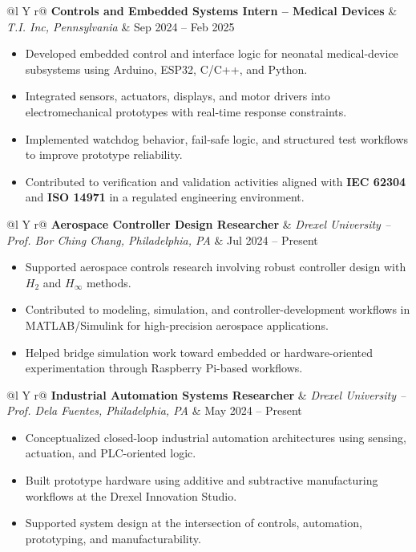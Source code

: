 \documentclass[10pt,letterpaper]{article}
\makeatletter
\newenvironment{role}[4]
{
\begin{tabularx}{\textwidth}{@{}l Y r@{}}
\textbf{#1} & \textit{#2, #3} & #4
\end{tabularx}
\vspace{-0.45em}
\begin{itemize}[leftmargin=1.2em, itemsep=0.18em, topsep=0.2em]
}
{
\end{itemize}
\vspace{0.15em}
}
\makeatother
\begin{document}
\begin{role}
{Controls and Embedded Systems Intern -- Medical Devices}
{T.I. Inc}
{Pennsylvania}
{Sep 2024 -- Feb 2025}
    \item Developed embedded control and interface logic for neonatal medical-device subsystems using Arduino, ESP32, C/C++, and Python.
    \item Integrated sensors, actuators, displays, and motor drivers into electromechanical prototypes with real-time response constraints.
    \item Implemented watchdog behavior, fail-safe logic, and structured test workflows to improve prototype reliability.
    \item Contributed to verification and validation activities aligned with \textbf{IEC 62304} and \textbf{ISO 14971} in a regulated engineering environment.
\end{role}

\begin{role}
{Aerospace Controller Design Researcher}
{Drexel University -- Prof. Bor Ching Chang}
{Philadelphia, PA}
{Jul 2024 -- Present}
    \item Supported aerospace controls research involving robust controller design with $H_2$ and $H_\infty$ methods.
    \item Contributed to modeling, simulation, and controller-development workflows in MATLAB/Simulink for high-precision aerospace applications.
    \item Helped bridge simulation work toward embedded or hardware-oriented experimentation through Raspberry Pi-based workflows.
\end{role}

\begin{role}
{Industrial Automation Systems Researcher}
{Drexel University -- Prof. Dela Fuentes}
{Philadelphia, PA}
{May 2024 -- Present}
    \item Conceptualized closed-loop industrial automation architectures using sensing, actuation, and PLC-oriented logic.
    \item Built prototype hardware using additive and subtractive manufacturing workflows at the Drexel Innovation Studio.
    \item Supported system design at the intersection of controls, automation, prototyping, and manufacturability.
\end{role}
\end{document}
